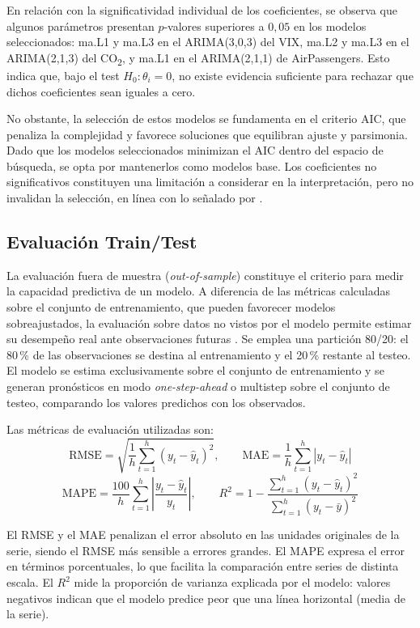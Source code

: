 \documentclass[12pt, a4paper]{article}
\begin{document}
En relación con la significatividad individual de los coeficientes, se observa que algunos parámetros presentan $p$-valores superiores a $0{,}05$ en los modelos seleccionados: ma.L1 y ma.L3 en el ARIMA(3,0,3) del VIX, ma.L2 y ma.L3 en el ARIMA(2,1,3) del CO\textsubscript{2}, y ma.L1 en el ARIMA(2,1,1) de AirPassengers. Esto indica que, bajo el test $H_0: \theta_i = 0$, no existe evidencia suficiente para rechazar que dichos coeficientes sean iguales a cero.

No obstante, la selección de estos modelos se fundamenta en el criterio AIC, que penaliza la complejidad y favorece soluciones que equilibran ajuste y parsimonia. Dado que los modelos seleccionados minimizan el AIC dentro del espacio de búsqueda, se opta por mantenerlos como modelos base. Los coeficientes no significativos constituyen una limitación a considerar en la interpretación, pero no invalidan la selección, en línea con lo señalado por .

\subsection{Evaluación Train/Test}

La evaluación fuera de muestra (\textit{out-of-sample}) constituye el criterio para medir la capacidad predictiva de un modelo. A diferencia de las métricas calculadas sobre el conjunto de entrenamiento, que pueden favorecer modelos sobreajustados, la evaluación sobre datos no vistos por el modelo permite estimar su desempeño real ante observaciones futuras \cite{diebold2007}. Se emplea una partición 80/20: el 80\,\% de las observaciones se destina al entrenamiento y el 20\,\% restante al testeo. El modelo se estima exclusivamente sobre el conjunto de entrenamiento y se generan pronósticos en modo \textit{one-step-ahead} o multistep sobre el conjunto de testeo, comparando los valores predichos con los observados.

Las métricas de evaluación utilizadas son:
$$\text{RMSE} = \sqrt{\frac{1}{h}\sum_{t=1}^{h}(y_t-\hat{y}_t)^2}, \qquad
  \text{MAE}  = \frac{1}{h}\sum_{t=1}^{h}|y_t-\hat{y}_t|$$
$$\text{MAPE} = \frac{100}{h}\sum_{t=1}^{h}\left|\frac{y_t-\hat{y}_t}{y_t}\right|, \qquad
  R^2 = 1 - \frac{\sum_{t=1}^{h}(y_t-\hat{y}_t)^2}{\sum_{t=1}^{h}(y_t-\bar{y})^2}$$

El RMSE y el MAE penalizan el error absoluto en las unidades originales de la serie, siendo el RMSE más sensible a errores grandes. El MAPE expresa el error en términos porcentuales, lo que facilita la comparación entre series de distinta escala. El $R^2$ mide la proporción de varianza explicada por el modelo: valores negativos indican que el modelo predice peor que una línea horizontal (media de la serie).
\end{document}
